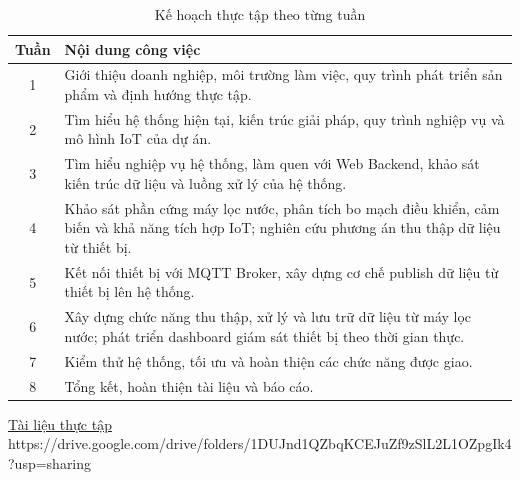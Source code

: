 \begin{table}[H]
\centering
\renewcommand{\arraystretch}{1.4}
\begin{tabularx}{\textwidth}{|c|X|}
\hline
\textbf{Tuần} & \centering\arraybackslash\textbf{Nội dung công việc} \\ \hline

1 &
Giới thiệu doanh nghiệp, môi trường làm việc, quy trình phát triển sản phẩm và định hướng thực tập.
\\ \hline

2 &
Tìm hiểu hệ thống hiện tại, kiến trúc giải pháp, quy trình nghiệp vụ và mô hình IoT của dự án.
\\ \hline

3 &
Tìm hiểu nghiệp vụ hệ thống, làm quen với Web Backend, khảo sát kiến trúc dữ liệu và luồng xử lý của hệ thống.
\\ \hline

4 &
Khảo sát phần cứng máy lọc nước, phân tích bo mạch điều khiển, cảm biến và khả năng tích hợp IoT; nghiên cứu phương án thu thập dữ liệu từ thiết bị.
\\ \hline

5 &
Kết nối thiết bị với MQTT Broker, xây dựng cơ chế publish dữ liệu từ thiết bị lên hệ thống.
\\ \hline

6 &
Xây dựng chức năng thu thập, xử lý và lưu trữ dữ liệu từ máy lọc nước; phát triển dashboard giám sát thiết bị theo thời gian thực.
\\ \hline

7 &
Kiểm thử hệ thống, tối ưu và hoàn thiện các chức năng được giao.
\\ \hline

8 &
Tổng kết, hoàn thiện tài liệu và báo cáo.
\\ \hline

\end{tabularx}
\caption{Kế hoạch thực tập theo từng tuần}
\label{tab:internship_plan}
\end{table}

\href{https://drive.google.com/drive/folders/1DUJnd1QZbqKCEJuZf9zSlL2L1OZpgIk4?usp=sharing}{Tài liệu thực tập}
https://drive.google.com/drive/folders/1DUJnd1QZbqKCEJuZf9zSlL2L1OZpgIk4?usp=sharing